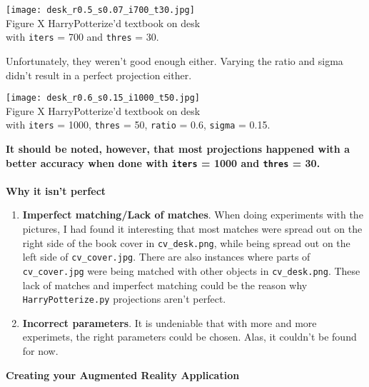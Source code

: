 \documentclass[12pt,letterpaper, onecolumn]{exam}
\begin{document}
\begin{questions}
\begin{solution}
\begin{center}
        \texttt{[image: desk\_r0.5\_s0.07\_i700\_t30.jpg]}\\
        Figure X HarryPotterize'd textbook on desk \\ with \texttt{iters} = 700 and \texttt{thres} = 30. \\
    \end{center}
    Unfortunately, they weren't good enough either. Varying the ratio and sigma didn't result in a perfect projection either.\\
    \begin{center}
        \texttt{[image: desk\_r0.6\_s0.15\_i1000\_t50.jpg]}\\
        Figure X HarryPotterize'd textbook on desk \\ with \texttt{iters} = 1000, \texttt{thres} = 50, \texttt{ratio} = 0.6, \texttt{sigma} = 0.15.
    \end{center}
    \textbf{It should be noted, however, that most projections happened with a better accuracy when done with \texttt{iters} = 1000 and \texttt{thres} = 30.} \\~\\
    \begingroup
        \Large \textbf{Why it isn't perfect}
    \endgroup
        \begin{enumerate}
            \item \textbf{Imperfect matching/Lack of matches}. When doing experiments with the pictures, I had found it interesting that most matches were spread out on the right side of the book cover in \texttt{cv\_desk.png}, while being spread out on the left side of \texttt{cv\_cover.jpg}. There are also instances where parts of \texttt{cv\_cover.jpg} were being matched with other objects in \texttt{cv\_desk.png}. These lack of matches and imperfect matching could be the reason why \texttt{HarryPotterize.py} projections aren't perfect.
            \item \textbf{Incorrect parameters}. It is undeniable that with more and more experimets, the right parameters could be chosen. Alas, it couldn't be found for now.
        \end{enumerate}
    \end{solution}

    \pagebreak

    \begingroup
    \large \textbf{Creating your Augmented Reality Application}
    \endgroup


\end{questions}
\end{document}
